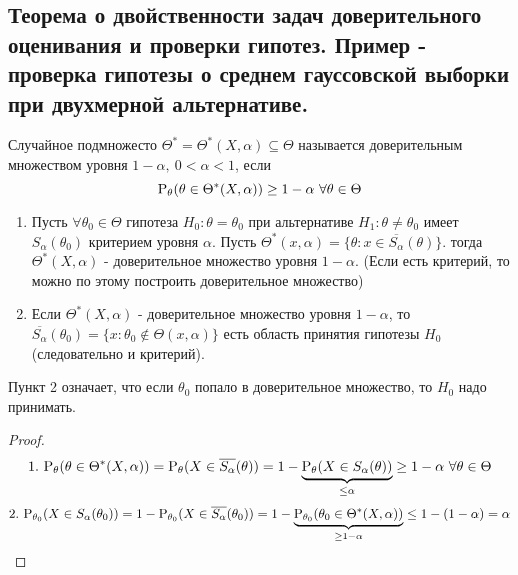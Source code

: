 \newpage
\subsection{Теорема о двойственности задач доверительного оценивания
и проверки гипотез. Пример - проверка гипотезы о среднем гауссовской выборки
при двухмерной альтернативе.}

\begin{definition}
    Случайное подмножесто \(\Theta^*=\Theta^*(X,\alpha)\subseteq\Theta\)
    называется доверительным множеством уровня \(1-\alpha,\ 0<\alpha<1\),
    если
    \[\P_\theta(\theta\in\Theta^*(X,\alpha))\geq 1-\alpha\ \forall\theta\in\Theta\]
\end{definition}
\begin{theorem} \label{th::trusted_set_eq_plausibility_test}
    \begin{enumerate}
        \item Пусть \(\forall\theta_0\in\Theta\) гипотеза \(H_0:\theta=\theta_0\)
        при альтернативе \(H_1:\theta\neq\theta_0\) имеет \(S_\alpha(\theta_0)\)
        критерием уровня \(\alpha\). Пусть \(\Theta^*(x,\alpha) = \{\theta:x\in\overline{S_\alpha}(\theta)\}\).
        тогда \(\Theta^*(X,\alpha)\) - доверительное множество уровня \(1-\alpha\).
        (Если есть критерий, то можно по этому  построить доверительное множество)

        \item Если \(\Theta^*(X,\alpha)\) - доверительное множество уровня \(1-\alpha\),
        то \(\overline{S_\alpha}(\theta_0)=\{x:\theta_0\notin\Theta(x,\alpha)\}\)
        есть область принятия гипотезы \(H_0\) (следовательно и критерий).
    \end{enumerate}
\end{theorem}
\begin{remark} \label{hyp::accept_HO}
    Пункт 2 означает, что если \(\theta_0\) попало в доверительное множество,
    то \(H_0\) надо принимать.
\end{remark}
\begin{proof}
    \[1.\ \P_\theta(\theta\in\Theta^*(X,\alpha)) = \P_\theta(X\in\overline{S_\alpha}(\theta)) = 1 - \underbrace{\P_\theta(X\in S_\alpha(\theta))}_{\leq\alpha}\geq 1-\alpha\ \forall\theta\in\Theta\]
    \[2.\ \P_{\theta_0}(X\in S_\alpha(\theta_0)) = 1-\P_{\theta_0}(X\in \overline{S_\alpha}(\theta_0))=
        1-\underbrace{\P_{\theta_0}(\theta_0\in\Theta^*(X,\alpha))}_{\geq 1-\alpha} \leq 1-(1-\alpha) = \alpha\]
\end{proof}
